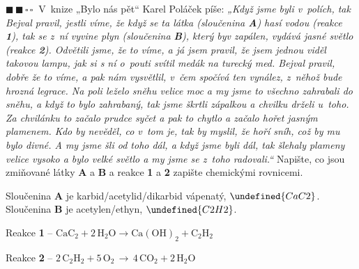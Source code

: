 \documentclass{book}
\let\ch\undefined
\newcommand{\dva}{$\blacksquare \, \blacksquare \, \square \, \square \; \; $}
\renewenvironment{quotation}{\par}{\par} %
\begin{document}
\hrulefill %
\begin{quotation}
\dva V~knize „Bylo nás pět“ Karel Poláček píše:\textit{ „Když jsme byli v~polích,
tak Bejval pravil, jestli víme, že když se ta látka (sloučenina \textbf{A})
hasí vodou (reakce \textbf{1}), tak se z~ní vyvine plyn (sloučenina \textbf{B}), který
byv zapálen, vydává jasné světlo (reakce \textbf{2}). Odvětili jsme, že to
víme, a já jsem pravil, že jsem jednou viděl takovou lampu, jak si
s ní o~pouti svítil medák na turecký med. Bejval pravil, dobře že
to víme, a pak nám vysvětlil, v~čem spočívá ten vynález, z~něhož bude
hrozná legrace. Na poli leželo sněhu velice moc a my jsme to všechno
zahrabali do sněhu, a když to bylo zahrabaný, tak jsme škrtli zápalkou
a chvilku drželi u~toho. Za chvilánku to začalo prudce syčet a pak
to chytlo a začalo hořet jasným plamenem. Kdo by nevěděl, co v~tom
je, tak by myslil, že hoří sníh, což by mu bylo divné. A my jsme šli
od toho dál, a když jsme byli dál, tak šlehaly plameny velice vysoko
a bylo velké světlo a my jsme se z~toho radovali.“} Napište, co jsou
zmiňované látky \textbf{A} a \textbf{B} a reakce \textbf{1} a \textbf{2} zapište chemickými rovnicemi.
\end{quotation} \dotfill \par 
Sloučenina \textbf{A} je karbid/acetylid/dikarbid vápenatý, $\ch{CaC2}$. Sloučenina \textbf{B} je acetylen/ethyn, $\ch{C2H2}$.

Reakce \textbf{1} -- $\mathrm{CaC_{2}+2\,H_{2}O\rightarrow Ca(OH)_{2}+C_{2}H_{2}}$ 

Reakce \textbf{2} -- $\mathrm{2\,C_{2}H_{2}+5\,O_{2}\, \rightarrow\, 4\,CO_{2}+2\,H_2 O}$
\end{document}
